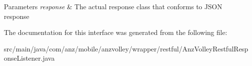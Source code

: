 \begin{DoxyParams}{Parameters}
{\em response} & The actual response class that conforms to J\+S\+O\+N response \\
\hline
\end{DoxyParams}


The documentation for this interface was generated from the following file\+:\begin{DoxyCompactItemize}
\item 
src/main/java/com/anz/mobile/anzvolley/wrapper/restful/Anz\+Volley\+Restful\+Response\+Listener.\+java\end{DoxyCompactItemize}
